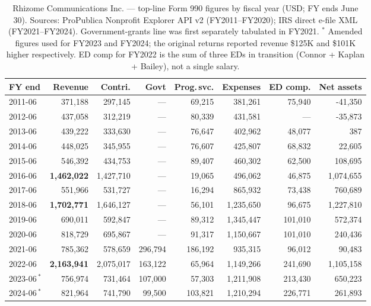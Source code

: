 \documentclass[10pt,letterpaper,twocolumn]{article}
\begin{document}
\begin{table}[t]
\footnotesize
\centering
\setlength{\tabcolsep}{4pt}
\begin{tabularx}{\textwidth}{Xrrrrrrr}
\toprule
\textbf{FY end} & \textbf{Revenue} & \textbf{Contri.} & \textbf{Govt} & \textbf{Prog.\,svc.} & \textbf{Expenses} & \textbf{ED comp.} & \textbf{Net assets} \\
\midrule
2011-06 & 371,188 & 297,145 & --- & 69,215 & 381,261 & 75,940 & -41,350 \\
2012-06 & 437,058 & 312,219 & --- & 80,339 & 431,581 & --- & -35,873 \\
2013-06 & 439,222 & 333,630 & --- & 76,647 & 402,962 & 48,077 & 387 \\
2014-06 & 448,025 & 345,955 & --- & 76,607 & 425,807 & 68,832 & 22,605 \\
2015-06 & 546,392 & 434,753 & --- & 89,407 & 460,302 & 62,500 & 108,695 \\
2016-06 & \textbf{1,462,022} & 1,427,710 & --- & 19,065 & 496,062 & 46,875 & 1,074,655 \\
2017-06 & 551,966 & 531,727 & --- & 16,294 & 865,932 & 73,438 & 760,689 \\
2018-06 & \textbf{1,702,771} & 1,646,127 & --- & 56,101 & 1,235,650 & 96,675 & 1,227,810 \\
2019-06 & 690,011 & 592,847 & --- & 89,312 & 1,345,447 & 101,010 & 572,374 \\
2020-06 & 818,729 & 695,867 & --- & 91,317 & 1,150,667 & 101,010 & 240,436 \\
2021-06 & 785,362 & 578,659 & 296,794 & 186,192 & 935,315 & 96,012 & 90,483 \\
2022-06 & \textbf{2,163,941} & 2,075,017 & 163,122 & 65,964 & 1,149,266 & 241,690 & 1,105,158 \\
2023-06\,$^{*}$ & 756,974 & 731,464 & 107,000 & 57,303 & 1,211,908 & 213,430 & 650,223 \\
2024-06\,$^{*}$ & 821,964 & 741,790 & 99,500 & 103,821 & 1,210,294 & 226,771 & 261,893 \\
\bottomrule
\end{tabularx}
\caption{Rhizome Communications Inc. --- top-line Form 990 figures by fiscal year (USD; FY ends June 30). Sources: ProPublica Nonprofit Explorer API v2 (FY2011--FY2020); IRS direct e-file XML (FY2021--FY2024). Government-grants line was first separately tabulated in FY2021. $^{*}$ Amended figures used for FY2023 and FY2024; the original returns reported revenue \$125K and \$101K higher respectively. ED comp for FY2022 is the sum of three EDs in transition (Connor + Kaplan + Bailey), not a single salary.}
\label{tab:financials}
\end{table}
\end{document}
